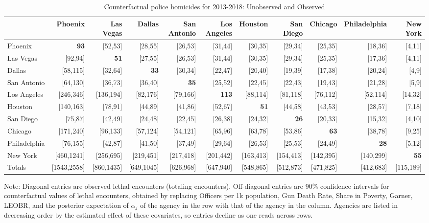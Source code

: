 \begin{table}[h!]\centering\scriptsize\tabcolsep=0.1cm\caption{Counterfactual police homicides for 2013-2018: Unobserved and Observed} \label{table:counterfactual_unobs_obs}\begin{tabular}{lrrrrrrrrrr}\hline \hline&Phoenix&Las Vegas&Dallas&San Antonio&Los Angeles&Houston&San Diego&Chicago&Philadelphia&New York\\
\hline
Phoenix&\textbf{93}&[52,53]&[28,55]&[26,53]&[31,44]&[30,35]&[29,34]&[25,35]&[18,36]&[4,11]\\
Las Vegas&[92,94]&\textbf{51}&[27,55]&[26,53]&[31,44]&[30,35]&[29,34]&[25,35]&[17,36]&[4,11]\\
Dallas&[58,115]&[32,64]&\textbf{33}&[30,34]&[22,47]&[20,40]&[19,39]&[17,38]&[20,24]&[4,9]\\
San Antonio&[64,130]&[36,73]&[36,40]&\textbf{35}&[25,52]&[22,45]&[22,43]&[19,43]&[21,28]&[5,9]\\
Los Angeles&[246,346]&[136,194]&[82,176]&[79,166]&\textbf{113}&[88,114]&[81,118]&[76,112]&[52,114]&[14,32]\\
Houston&[140,163]&[78,91]&[44,89]&[41,86]&[52,67]&\textbf{51}&[44,58]&[43,53]&[28,57]&[7,18]\\
San Diego&[75,87]&[42,49]&[24,48]&[22,45]&[26,38]&[24,32]&\textbf{26}&[20,33]&[15,32]&[4,10]\\
Chicago&[171,240]&[96,133]&[57,124]&[54,121]&[65,96]&[63,78]&[53,86]&\textbf{63}&[38,78]&[9,25]\\
Philadelphia&[76,155]&[42,87]&[41,50]&[37,49]&[29,64]&[26,53]&[25,53]&[24,49]&\textbf{28}&[5,12]\\
New York&[460,1241]&[256,695]&[219,451]&[217,418]&[201,442]&[163,413]&[154,413]&[142,395]&[140,299]&\textbf{55}\\
\hline
Totals&[1543,2558]&[860,1435]&[649,1045]&[626,968]&[647,940]&[548,865]&[512,873]&[471,825]&[412,683]&[115,189]\\
\hline 
 \end{tabular} 
 \begin{center} 
 \begin{minipage}{1.05\textwidth} %
 {\footnotesize Note: Diagonal entries are observed lethal encounters (totaling \totalincidentsten{} encounters). Off-diagonal entries are 90\% confidence intervals for counterfactual values of lethal encounters, obtained by replacing Officers per 1k population, Gun Death Rate, Share in Poverty, Garner, LEOBR, and the posterior expectation of $\alpha_j$ of the agency in the row with that of the agency in the column. Agencies are listed in decreasing order by the estimated effect of these covariates, so entries decline as one reads across rows.} 
 \end{minipage} 
 \end{center} 
 \end{table}